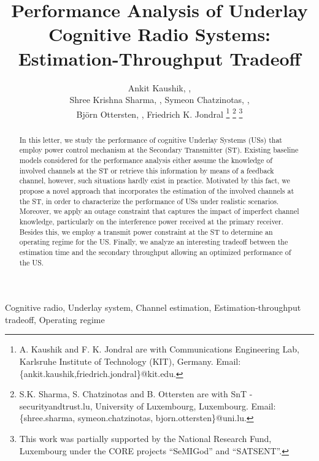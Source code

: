 \documentclass[letterpaper, twocolumn]{IEEEtran}
\newcommand{\imp}{\uline}
\newcommand{\ur}{\uuline}
\newcommand{\ns}{\uwave}
\newcommand{\ws}{\sout}
\newcommand{\fl}{\dashuline}
\newcommand{\un}{\dotuline}
\begin{document}
%
\title{Performance Analysis of Underlay Cognitive Radio Systems: Estimation-Throughput Tradeoff}
\author{Ankit Kaushik, ,\\ Shree Krishna Sharma,  , Symeon Chatzinotas, ,  \\ Bj\"orn Ottersten, , Friedrich K. Jondral 
\thanks{A. Kaushik and F. K. Jondral are with Communications Engineering Lab, Karlsruhe Institute of Technology (KIT), Germany. Email:{\{ankit.kaushik,friedrich.jondral\}@kit.edu.}}
\thanks{S.K. Sharma, S. Chatzinotas and B. Ottersten are with SnT - securityandtrust.lu, University of Luxembourg, Luxembourg. Email:{\{shree.sharma, symeon.chatzinotas, bjorn.ottersten\}@uni.lu}.}
\thanks{This work was partially supported by the National Research Fund, Luxembourg under the CORE projects ``SeMIGod'' and ``SATSENT''.}
}

\maketitle
\thispagestyle{empty}
\pagestyle{empty}

\begin{abstract}
In this letter, we study the performance of cognitive Underlay Systems (USs) that employ power control mechanism at the Secondary Transmitter (ST). Existing baseline models considered for the performance analysis either assume the knowledge of involved channels at the ST or retrieve this information by means of a feedback channel, however, such situations hardly exist in practice. Motivated by this fact, we propose a novel approach that incorporates the estimation of the involved channels at the ST, in order to characterize the performance of USs under realistic scenarios. Moreover, we apply an outage constraint that captures the impact of imperfect channel knowledge, particularly on the interference power received at the primary receiver. Besides this, we employ a transmit power constraint at the ST to determine an operating regime for the US. Finally, we analyze an interesting tradeoff between the estimation time and the secondary throughput allowing an optimized performance of the US. 
\end{abstract}
\begin{keywords}
Cognitive radio, Underlay system, Channel estimation, Estimation-throughput tradeoff, Operating regime
\end{keywords}
\end{document}
